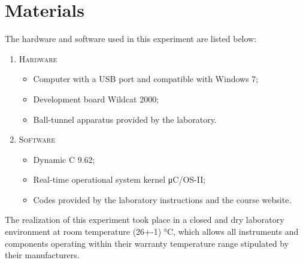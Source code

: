 \section{Materials}

The hardware and software used in this experiment are listed below:

\begin{enumerate}[]
\item \textsc{Hardware}
\begin{itemize}[label={--}]
\item Computer with a USB port and compatible with Windows 7;
\item Development board Wildcat 2000;
\item Ball-tunnel apparatus provided by the laboratory.
\end{itemize}

\item \textsc{Software}
\begin{itemize}[label={--}]
\item Dynamic C 9.62;
\item Real-time operational system kernel μC/OS-II;
\item Codes provided by the laboratory instructions and the course website.
\end{itemize}
\end{enumerate}

The realization of this experiment took place in a closed and dry laboratory environment at room temperature (26+-1) °C, which allows all instruments and components operating within their warranty temperature range stipulated by their manufacturers.
